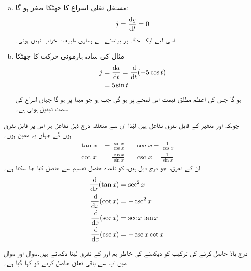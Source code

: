 \begin{enumerate}[a.]

\item
مستقل ثقلی اسراع  کا جھٹکا صفر ہو گا:
\begin{align*}
j=\frac{\dif g}{\dif t}=0
\end{align*}
اسی لیے ایک جگہ پر  بیٹھنے سے  ہماری طبیعت خراب نہیں ہوتی۔
\item
مثال  کی سادہ ہارمونی حرکت  کا جھٹکا
\begin{align*}
j&=\frac{\dif a}{\dif t}=\frac{\dif}{\dif t}(-5\cos t)\\
&=5\sin t
\end{align*}
ہو گا جس کی اعظم مطلق قیمت اس لمحے پر ہو گی جب  ہو جو مبدا پر ہو گا جہاں اسراع کی سمت تبدیل ہوتی ہے۔
\end{enumerate}

چونکہ  اور  متغیر  کے قابل تفرق تفاعل ہیں لہٰذا ان سے متعلقہ درج ذیل تفاعل ہر اس   پر قابل تفرق ہوں گے جہاں یہ معین ہوں۔
\begin{align*}
\tan x&=\frac{\sin x}{\cos x}&&\sec x=\frac{1}{\cos x}\\[0.5em]
\cot x&=\frac{\cos x}{\sin x}&& \csc x=\frac{1}{\sin x}
\end{align*} 
ان کے تفرق،  جو درج ذیل ہیں،  کو قاعدہ حاصل تقسیم سے حاصل کیا جا سکتا ہے۔ 
\begin{gather}
\begin{aligned}\label{مساوات_تفرق_تکونیاتی_تفاعل_الف}
\frac{\dif}{\dif x}(\tan x)&=\sec^2 x\\
\frac{\dif}{\dif x}(\cot x)&=-\csc^2x\\
\frac{\dif}{\dif x}(\sec x)&=\sec x\tan x\\
\frac{\dif}{\dif x}(\csc x)&=-\csc x\cot x
\end{aligned}
\end{gather}

درج بالا حاصل کرنے کی ترکیب کو دیکھنے کی خاطر ہم  اور  کے تفرق لینا دکھاتے ہیں۔سوال  اور سوال  میں آپ سے باقی تعلق حاصل کرنے کو کہا گیا ہے۔

